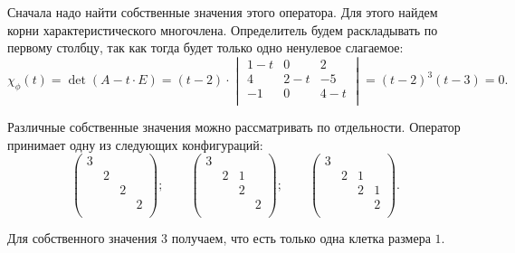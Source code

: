 \documentclass[a4paper]{article}
\begin{document}
    \begin{solution}
        Сначала надо найти собственные значения этого оператора. Для этого найдем корни характеристического многочлена. Определитель будем раскладывать по первому столбцу, так как тогда будет только одно ненулевое слагаемое:
        \begin{equation*}
            \chi_{\phi}(t) = \det(A - t \cdot E) = (t - 2) \cdot \begin{vmatrix}
                1 - t & 0 & 2 \\
                4 & 2 - t & -5 \\
                -1 & 0 & 4 - t \\
            \end{vmatrix} = (t - 2)^3 (t - 3) = 0.
        \end{equation*}

        Различные собственные значения можно рассматривать по отдельности. Оператор принимает одну из следующих конфигураций:
        \begin{equation*}
            \begin{pmatrix}
                3 & & & \\
                & 2 & & \\
                & & 2 & \\
                & & & 2 \\
            \end{pmatrix}; \quad \quad
            \begin{pmatrix}
                3 & & & \\
                & 2 & 1 & \\
                & & 2 & \\
                & & & 2\\
            \end{pmatrix}; \quad \quad
            \begin{pmatrix}
                3 & & & \\
                & 2 & 1 & \\
                & & 2 & 1\\
                & & & 2 \\
            \end{pmatrix}.
        \end{equation*}

        \begin{options}
        \item 
            Для собственного значения $3$ получаем, что есть только одна клетка размера $1$.


\end{options}
\end{solution}
\end{document}
